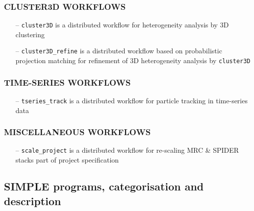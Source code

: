 \documentclass[a4paper,11pt]{article}
\newcommand{\prgname}[1]{\textcolor{NavyBlue}{\texttt{#1}}}
\begin{document}
\subsubsection{CLUSTER3D WORKFLOWS}
\begin{itemize}
\item[--] \prgname{cluster3D} is a distributed workflow for heterogeneity analysis by 3D clustering
\item[--] \prgname{cluster3D\_refine} is a distributed workflow based on probabilistic projection matching for refinement of 3D heterogeneity analysis by \prgname{cluster3D}
\end{itemize}

\subsubsection{TIME-SERIES WORKFLOWS}
\begin{itemize}
\item[--] \prgname{tseries\_track} is a distributed workflow for particle tracking in time-series data
\end{itemize}

\subsubsection{MISCELLANEOUS WORKFLOWS}
\begin{itemize}
\item[--] \prgname{scale\_project} is a distributed workflow for re-scaling MRC \& SPIDER stacks part of project specification
\end{itemize}

\subsection{SIMPLE programs, categorisation and description}
\end{document}
